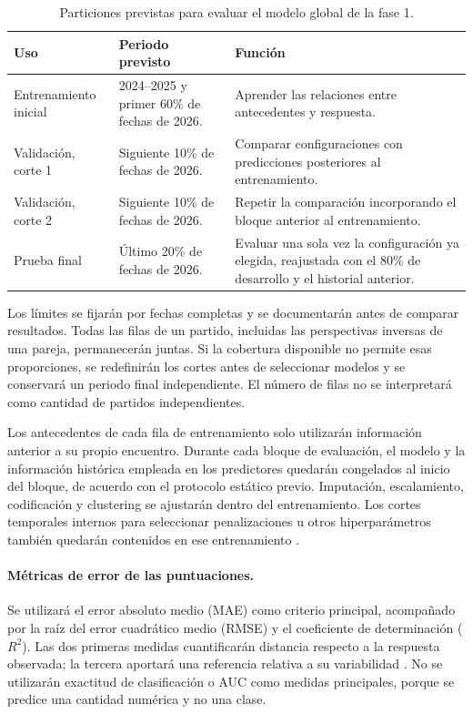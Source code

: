 \begin{table}[htbp]
\centering
\small
\caption{Particiones previstas para evaluar el modelo global de la fase 1.}
\label{tab:particiones-modelo-6161}
\begin{tabularx}{\textwidth}{@{}p{2.3cm}XX@{}}
\toprule
\textbf{Uso} & \textbf{Periodo previsto} & \textbf{Función}\\
\midrule
Entrena\-miento inicial & 2024--2025 y primer 60\% de fechas de 2026. & Aprender las relaciones entre antecedentes y respuesta.\\
Validación, corte 1 & Siguiente 10\% de fechas de 2026. & Comparar configuraciones con predicciones posteriores al entrenamiento.\\
Validación, corte 2 & Siguiente 10\% de fechas de 2026. & Repetir la comparación incorporando el bloque anterior al entrenamiento.\\
Prueba final & Último 20\% de fechas de 2026. & Evaluar una sola vez la configuración ya elegida, reajustada con el 80\% de desarrollo y el historial anterior.\\
\bottomrule
\end{tabularx}
\end{table}

Los límites se fijarán por fechas completas y se documentarán antes de comparar resultados. Todas las filas de un partido, incluidas las perspectivas inversas de una pareja, permanecerán juntas. Si la cobertura disponible no permite esas proporciones, se redefinirán los cortes antes de seleccionar modelos y se conservará un periodo final independiente. El número de filas no se interpretará como cantidad de partidos independientes.

Los antecedentes de cada fila de entrenamiento solo utilizarán información anterior a su propio encuentro. Durante cada bloque de evaluación, el modelo y la información histórica empleada en los predictores quedarán congelados al inicio del bloque, de acuerdo con el protocolo estático previo. Imputación, escalamiento, codificación y clustering se ajustarán dentro del entrenamiento. Los cortes temporales internos para seleccionar penalizaciones u otros hiperparámetros también quedarán contenidos en ese entrenamiento \cite{sklearnCommonPitfallsPonderacion,cawley2010selection}.

\paragraph*{Métricas de error de las puntuaciones.}
Se utilizará el error absoluto medio (MAE) como criterio principal, acompañado por la raíz del error cuadrático medio (RMSE) y el coeficiente de determinación ($R^2$). Las dos primeras medidas cuantificarán distancia respecto a la respuesta observada; la tercera aportará una referencia relativa a su variabilidad \cite{sklearnMetricas6161}. No se utilizarán exactitud de clasificación o AUC como medidas principales, porque se predice una cantidad numérica y no una clase.

